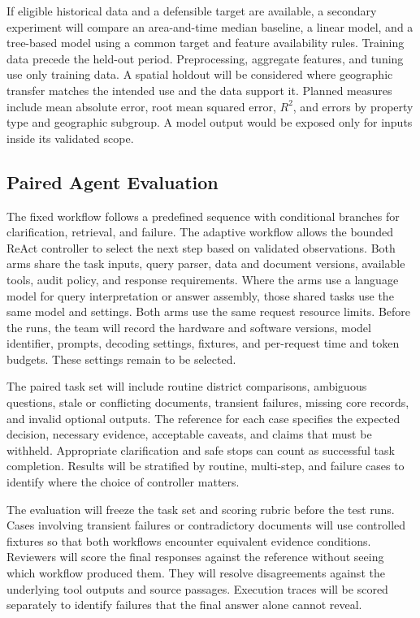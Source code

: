 If eligible historical data and a defensible target are available, a secondary experiment will compare an area-and-time median baseline, a linear model, and a tree-based model using a common target and feature availability rules. Training data precede the held-out period. Preprocessing, aggregate features, and tuning use only training data. A spatial holdout will be considered where geographic transfer matches the intended use and the data support it. Planned measures include mean absolute error, root mean squared error, \(R^2\), and errors by property type and geographic subgroup. A model output would be exposed only for inputs inside its validated scope.

\subsection{Paired Agent Evaluation}
The fixed workflow follows a predefined sequence with conditional branches for clarification, retrieval, and failure. The adaptive workflow allows the bounded ReAct controller to select the next step based on validated observations. Both arms share the task inputs, query parser, data and document versions, available tools, audit policy, and response requirements. Where the arms use a language model for query interpretation or answer assembly, those shared tasks use the same model and settings. Both arms use the same request resource limits. Before the runs, the team will record the hardware and software versions, model identifier, prompts, decoding settings, fixtures, and per-request time and token budgets. These settings remain to be selected.

The paired task set will include routine district comparisons, ambiguous questions, stale or conflicting documents, transient failures, missing core records, and invalid optional outputs. The reference for each case specifies the expected decision, necessary evidence, acceptable caveats, and claims that must be withheld. Appropriate clarification and safe stops can count as successful task completion. Results will be stratified by routine, multi-step, and failure cases to identify where the choice of controller matters.

The evaluation will freeze the task set and scoring rubric before the test runs. Cases involving transient failures or contradictory documents will use controlled fixtures so that both workflows encounter equivalent evidence conditions. Reviewers will score the final responses against the reference without seeing which workflow produced them. They will resolve disagreements against the underlying tool outputs and source passages. Execution traces will be scored separately to identify failures that the final answer alone cannot reveal.

